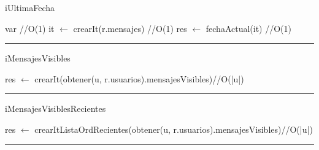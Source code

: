 \begin{algorithm}[H]
\caption{iUltimaFecha}
\begin{algorithmic}[1]
\state var  \hfill//O(1)
\state it $\gets$ crearIt(r.mensajes) \hfill//O(1)
\state res $\gets$ fechaActual(it) \hfill//O(1)
\EndFunction 
\end{algorithmic}
\hrule
{}
\end{algorithm}

\begin{algorithm}[H]
\caption{iMensajesVisibles}
\begin{algorithmic}[1]
\state res $\gets$ crearIt(obtener(u, r.usuarios).mensajesVisibles)\hfill//O(|u|)
\EndFunction 
\end{algorithmic}
\hrule
{}
\end{algorithm}

\begin{algorithm}[H]
\caption{iMensajesVisiblesRecientes}
\begin{algorithmic}[1]
\state res $\gets$ crearItListaOrdRecientes(obtener(u, r.usuarios).mensajesVisibles)\hfill//O(|u|)
\EndFunction 
\end{algorithmic}
\hrule
{}
\end{algorithm}

